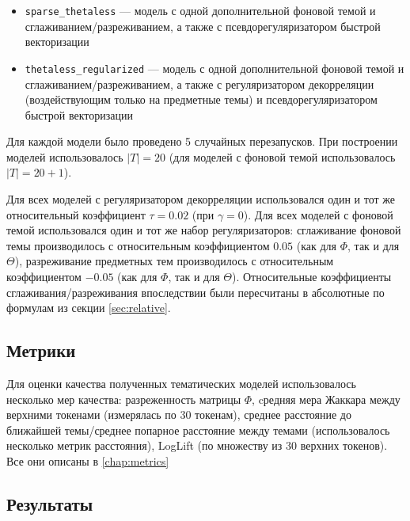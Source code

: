 \begin{itemize}
\begin{itemize}
        \item \texttt{sparse\_thetaless} --- модель с одной дополнительной фоновой темой и сглаживанием/разреживанием, а также с псевдорегуляризатором быстрой векторизации 

        \item \texttt{thetaless\_regularized} --- модель с одной дополнительной фоновой темой и сглаживанием/разреживанием, а также с регуляризатором декорреляции (воздействующим только на предметные темы) и псевдорегуляризатором быстрой векторизации 

    \end{itemize} 

\end{itemize} 

 

Для каждой модели было проведено 5 случайных перезапусков. При построении моделей использовалось $|T|= 20$ (для моделей с фоновой темой использовалось $|T|= 20+1$). 

 

Для всех моделей с регуляризатором декорреляции использовался один и тот же относительный коэффициент $\tau = 0.02$ (при $\gamma=0$). Для всех моделей с фоновой темой использовался один и тот же набор регуляризаторов: сглаживание фоновой темы производилось с относительным коэффициентом $0.05$ (как для $\Phi$, так и для $\Theta$), разреживание предметных тем производилось  с относительным коэффициентом $-0.05$ (как для $\Phi$, так и для $\Theta$). Относительные коэффициенты сглаживания/разреживания впоследствии были пересчитаны в абсолютные по формулам из секции \ref{sec:relative}. 

 

\subsection{Метрики} 

 

Для оценки качества полученных тематических моделей использовалось несколько мер качества: разреженность матрицы $\Phi$, cредняя мера Жаккара между верхними токенами (измерялась по 30 токенам), среднее расстояние до ближайшей темы/среднее попарное расстояние между темами (использовалось несколько метрик расстояния), LogLift (по множеству из 30 верхних токенов). Все они описаны в \ref{chap:metrics} 

 

\subsection{Результаты} 

